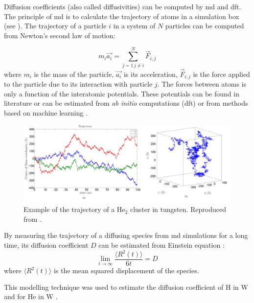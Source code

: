 Diffusion coefficients (also called diffusivities) can be computed by \gls{md} and \gls{dft}.
The principle of \gls{md} is to calculate the trajectory of atoms in a simulation box (see ).
The trajectory of a particle $i$ in a system of $N$ particles can be computed from Newton's second law of motion:

\begin{equation}
    m_i \vec{a_i} = \sum_{j=1 \, j \neq i}^N \vec{F}_{i,j}
\end{equation}
where $m_i$ is the mass of the particle, $\vec{a_i}$ is its acceleration, $\vec{F}_{i,j}$ is the force applied to the particle due to its interaction with particle $j$.
The forces between atoms is only a function of the interatomic potentials.
These potentials can be found in literature or can be estimated from \textit{ab initio} computations (\gls{dft})  or from methods based on machine learning .

\begin{figure}
    \centering
    \includegraphics[width=\linewidth]{Figures/Chapter1/faney_md.jpg}
    \caption{Example of the trajectory of a He$_2$ cluster in tungsten. Reproduced from \cite{faney_numerical_2013}.}
\end{figure}

By measuring the trajectory of a diffusing species from \gls{md} simulations for a long time, its diffusion coefficient $D$ can be estimated from Einstein equation \cite{einstein_uber_1905}:
\begin{equation}
    \lim_{t\to\infty} \frac{\langle R^2(t) \rangle}{6t} = D
\end{equation}
where $\langle R^2(t) \rangle$ is the mean squared displacement of the species.

This modelling technique was used to estimate the diffusion coefficient of \gls{H} in \gls{W}  and for He in \gls{W} .

